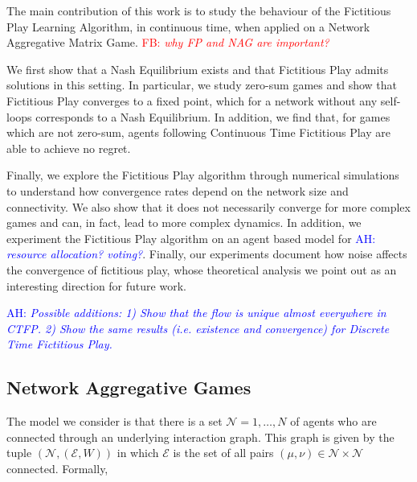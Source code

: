 \documentclass{article}
\theoremstyle{definition}
\newcommand{\ah}[1]{\textcolor{blue}{AH: \textit{#1}}}
\newcommand{\fb}[1]{\textcolor{red}{FB: \textit{#1}}}
\newcommand{\agentset}{\mathcal{N}}
\newcommand{\edgeset}{\mathcal{E}}
\newcommand{\weightset}{W}
\begin{document}
		The main contribution of this work is to study the
                behaviour of the Fictitious Play Learning Algorithm,
                in continuous time, when applied on a Network
                Aggregative Matrix Game.
\fb{why FP and NAG are important?}


                We first show that a Nash
                Equilibrium exists and that Fictitious Play admits
                solutions in this setting. In particular, we study
                zero-sum games and show that Fictitious Play converges
                to a fixed point, which for a network without any self-loops
                corresponds to a Nash Equilibrium. In addition, we
                find that, for games which are not zero-sum, agents
                following Continuous Time Fictitious Play are able to
                achieve no regret.

		Finally, we explore the Fictitious Play algorithm
                through numerical simulations to understand how
                convergence rates depend on the network size and
                connectivity. We also show that it does not
                necessarily converge for more complex games and can,
                in fact, lead to more complex dynamics. In addition,
                we experiment the Fictitious Play algorithm on an
                agent based model for \ah{resource allocation? 
                voting?}. Finally, our experiments document how noise
                affects the convergence of fictitious play, whose
                theoretical analysis we point out as an interesting
                direction for future work.

		\ah{Possible additions: 1) Show that the flow is
                  unique almost everywhere in CTFP. 2) Show the same
                  results (i.e. existence and convergence) for
                  Discrete Time Fictitious Play.}


	\subsection{Network Aggregative Games}
	\label{sec::NAG}

	The model we consider is that there is a set $\agentset = {1,
         \ldots , N}$ of agents who are connected through an underlying
        interaction graph. This graph is given by the tuple
        $(\agentset, (\edgeset, \weightset))$ in which $\edgeset$ is
        the set of all pairs $(\mu, \nu) \in \agentset \times \agentset$
        connected. Formally,
        
\end{document}

